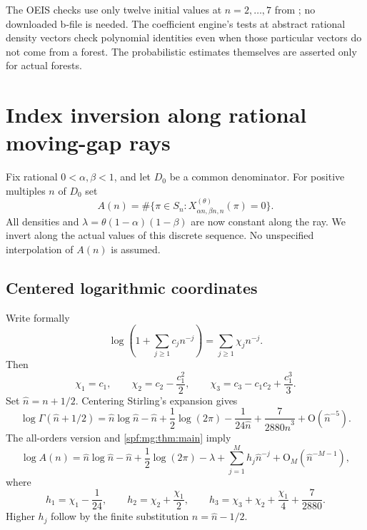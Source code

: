 \documentclass[11pt]{article}
\numberwithin{equation}{section}
\theoremstyle{definition}
\theoremstyle{remark}
\theoremstyle{definition}
\newcommand{\bigO}{\mathrm O}
\begin{document}
The OEIS checks use only twelve initial values at $n=2,\ldots,7$ from
\cite{oeis189281,oeis110128}; no downloaded b-file is needed. The coefficient
engine's tests at abstract rational density vectors check polynomial
identities even when those particular vectors do not come from a forest.
The probabilistic estimates themselves are asserted only for actual
forests.

\section{Index inversion along rational moving-gap rays}
\label{spf:mg:sec:inverse}

Fix rational $0<\alpha,\beta<1$, and let $D_0$ be a common denominator.
For positive multiples $n$ of $D_0$ set
\begin{equation}
 A(n)=\#\{\pi\in S_n:X^{(\theta)}_{\alpha n,\beta n,n}(\pi)=0\}.
 \label{spf:mg:eq:An}
\end{equation}
All densities and $\lambda=\theta(1-\alpha)(1-\beta)$ are now constant
along the ray. We invert along the actual values of this discrete
sequence. No unspecified interpolation of $A(n)$ is assumed.

\subsection{Centered logarithmic coordinates}

Write formally
\begin{equation}
 \log\left(1+\sum_{j\ge1}c_jn^{-j}\right)
       =\sum_{j\ge1}\chi_jn^{-j}.
 \label{spf:mg:eq:psi}
\end{equation}
Then
\begin{equation}
 \chi_1=c_1,\qquad
 \chi_2=c_2-\frac{c_1^2}{2},\qquad
 \chi_3=c_3-c_1c_2+\frac{c_1^3}{3}.
 \label{spf:mg:eq:psi3}
\end{equation}
Set $\hat n=n+1/2$. Centering Stirling's expansion
\cite{dlmfGamma} gives
\begin{equation}
 \log\Gamma(\hat n+1/2)
 =\hat n\log \hat n-\hat n+\frac12\log(2\pi)
       -\frac1{24\hat n}+\frac7{2880\hat n^3}+\bigO(\hat n^{-5}).
 \label{spf:mg:eq:center-stirling}
\end{equation}
The all-orders version and \cref{spf:mg:thm:main} imply
\begin{equation}
 \log A(n)=\hat n\log \hat n-\hat n+\frac12\log(2\pi)-\lambda
                   +\sum_{j=1}^{M}h_j\hat n^{-j}
                   +\bigO_M(\hat n^{-M-1}),
 \label{spf:mg:eq:logA}
\end{equation}
where
\begin{equation}
 h_1=\chi_1-\frac1{24},\qquad
 h_2=\chi_2+\frac{\chi_1}{2},\qquad
 h_3=\chi_3+\chi_2+\frac{\chi_1}{4}+\frac7{2880}.
 \label{spf:mg:eq:h3}
\end{equation}
Higher $h_j$ follow by the finite substitution $n=\hat n-1/2$.
\end{document}
